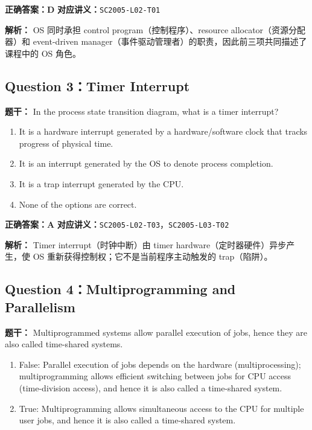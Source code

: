 \documentclass[11pt,a4paper,fontset=fandol]{ctexart}
\renewcommand{\exercisequestion}[2]{%
  \Needspace{5\baselineskip}%
  \subsection{#2}\label{exercise:#1}%
}
\renewenvironment{checkedsolution}
  {\par\nopagebreak[4]\textbf{解析：}\ignorespaces}
  {\par}
\begin{document}
\textbf{正确答案：D}\qquad
\textbf{对应讲义：}\texttt{SC2005-L02-T01}

\begin{checkedsolution}
OS 同时承担 control program（控制程序）、resource allocator（资源分配器）和 event-driven manager（事件驱动管理者）的职责，因此前三项共同描述了课程中的 OS 角色。
\end{checkedsolution}

\exercisequestion{SC2005-HW01-Q03}{Question 3：Timer Interrupt}

\textbf{题干：} In the process state transition diagram, what is a timer interrupt?

\begin{enumerate}[label=\Alph*.,leftmargin=2.4em]
  \item It is a hardware interrupt generated by a hardware/software clock that tracks progress of physical time.
  \item It is an interrupt generated by the OS to denote process completion.
  \item It is a trap interrupt generated by the CPU.
  \item None of the options are correct.
\end{enumerate}

\textbf{正确答案：A}\qquad
\textbf{对应讲义：}\texttt{SC2005-L02-T03}，\texttt{SC2005-L03-T02}

\begin{checkedsolution}
Timer interrupt（时钟中断）由 timer hardware（定时器硬件）异步产生，使 OS 重新获得控制权；它不是当前程序主动触发的 trap（陷阱）。
\end{checkedsolution}

\exercisequestion{SC2005-HW01-Q04}{Question 4：Multiprogramming and Parallelism}

\textbf{题干：} Multiprogrammed systems allow parallel execution of jobs, hence they are also called time-shared systems.

\begin{enumerate}[label=\Alph*.,leftmargin=2.4em]
  \item False: Parallel execution of jobs depends on the hardware (multiprocessing); multiprogramming allows efficient switching between jobs for CPU access (time-division access), and hence it is also called a time-shared system.
  \item True: Multiprogramming allows simultaneous access to the CPU for multiple user jobs, and hence it is also called a time-shared system.
\end{enumerate}
\end{document}
